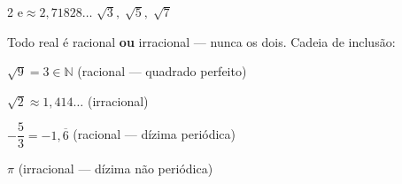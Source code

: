 \documentclass[12pt,twoside]{article}
\begin{document}
\begin{multicols}{2}
$\mathrm{e} \approx 2{,}71828\ldots$ \quad $\sqrt{3},\; \sqrt{5},\; \sqrt{7}$



Todo real é racional \textbf{ou} irracional — nunca os dois. Cadeia de inclusão:



$\sqrt{9} = 3 \in \mathbb{N}$ \hfill (racional — quadrado perfeito)

$\sqrt{2} \approx 1{,}414\ldots$ \hfill (irracional)

$-\dfrac{5}{3} = -1{,}\overline{6}$ \hfill (racional — dízima periódica)

$\pi$ \hfill (irracional — dízima não periódica)


\end{multicols}


\end{document}
